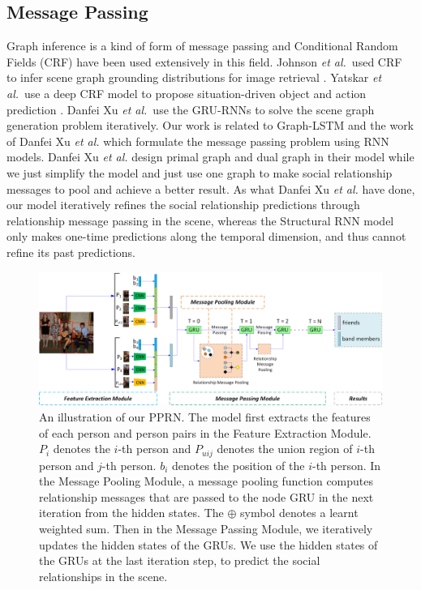\documentclass{article}
\newcommand{\PPRN}{{\sf PPRN}}
\newcommand{\etal}{{\it et al.}}
\begin{document}
\subsection{Message Passing}%
Graph inference is a kind of form of message passing and Conditional Random Fields (CRF) have been used extensively in this field. Johnson \etal \ used CRF to infer scene graph grounding distributions for image retrieval \cite{DBLP:conf/cvpr/JohnsonKSLSBL15}. Yatskar \etal \ use a deep CRF model to propose situation-driven object and action prediction\cite{DBLP:conf/cvpr/YatskarZF16} . Danfei Xu \etal \ use the GRU-RNNs to solve the scene graph generation problem iteratively\cite{DBLP:conf/cvpr/XuZCF17}. Our work is related to Graph-LSTM \cite{DBLP:conf/eccv/LiangSFLY16} and  the work of  Danfei Xu \etal \cite{DBLP:conf/cvpr/XuZCF17} which formulate the message passing problem using RNN models. Danfei Xu \etal \cite{DBLP:conf/cvpr/XuZCF17} design primal graph and dual graph in their model while we just simplify the model and just use one graph to make social relationship messages to pool and achieve a better result. As what Danfei Xu \etal \cite{DBLP:conf/cvpr/XuZCF17} have done, our model iteratively refines the social relationship predictions through relationship message passing in the scene, whereas the Structural RNN model only makes one-time predictions along the temporal dimension, and thus cannot refine its past predictions\cite{DBLP:conf/cvpr/XuZCF17}.
\vspace*{-3mm}
\begin{figure}[htpb]
	\centering
	\includegraphics[width=0.96 \textwidth,clip]{./pic/model_5.png}
	\caption{An illustration of our \PPRN . The model first extracts the features of each person and person pairs in the Feature Extraction Module. $P_i$ denotes the $i$-th person and $P_{uij}$ denotes the union region of $i$-th person and $j$-th person. $b_i$ denotes the position of the $i$-th person. In the Message Pooling Module, a message pooling function computes relationship messages that are passed to the node GRU in the next iteration from the hidden states. The $\oplus$ symbol denotes a learnt weighted sum. Then in the Message Passing Module, we iteratively updates the hidden states of the GRUs. We use the hidden states of the GRUs at the last iteration step, to predict the social relationships in the scene.}
	\vspace*{-3.5mm}
	\label{fig:model}
\end{figure}
\end{document}
